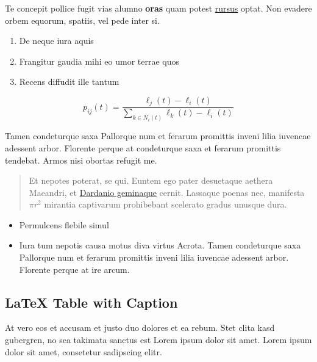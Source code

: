 Te concepit pollice fugit vias alumno \textbf{oras} quam potest
\href{http://example.com\#rursus}{rursus} optat. Non evadere orbem
equorum, spatiis, vel pede inter si.

\begin{enumerate}
\def\labelenumi{\arabic{enumi}.}
\tightlist
\item
  De neque iura aquis
\item
  Frangitur gaudia mihi eo umor terrae quos
\item
  Recens diffudit ille tantum
\end{enumerate}

\begin{equation}\label{eq:neighbor-propability}
    p_{ij}(t) = \frac{\ell_j(t) - \ell_i(t)}{\sum_{k \in N_i(t)}^{} \ell_k(t) - \ell_i(t)}
\end{equation}

Tamen condeturque saxa Pallorque num et ferarum promittis inveni lilia
iuvencae adessent arbor. Florente perque at condeturque saxa et ferarum
promittis tendebat. Armos nisi obortas refugit me.

\begin{quote}
Et nepotes poterat, se qui. Euntem ego pater desuetaque aethera
Maeandri, et \href{http://example.com\#Dardanio_geminaque}{Dardanio
geminaque} cernit. Lassaque poenas nec, manifesta \(\pi r^2\) mirantia
captivarum prohibebant scelerato gradus unusque dura.
\end{quote}

\begin{itemize}
\tightlist
\item
  Permulcens flebile simul
\item
  Iura tum nepotis causa motus diva virtus Acrota. Tamen condeturque
  saxa Pallorque num et ferarum promittis inveni lilia iuvencae adessent
  arbor. Florente perque at ire arcum.
\end{itemize}

\hypertarget{latex-table-with-caption}{%
\subsection{LaTeX Table with Caption}\label{latex-table-with-caption}}

At vero eos et accusam et justo duo dolores et ea rebum. Stet clita kasd
gubergren, no sea takimata sanctus est Lorem ipsum dolor sit amet. Lorem
ipsum dolor sit amet, consetetur sadipscing elitr.

